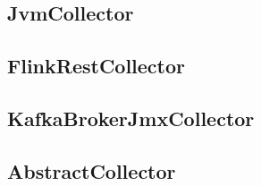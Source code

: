 %

\subsection{JvmCollector}


\subsection{FlinkRestCollector}

\subsection{KafkaBrokerJmxCollector}

\subsection{AbstractCollector}

